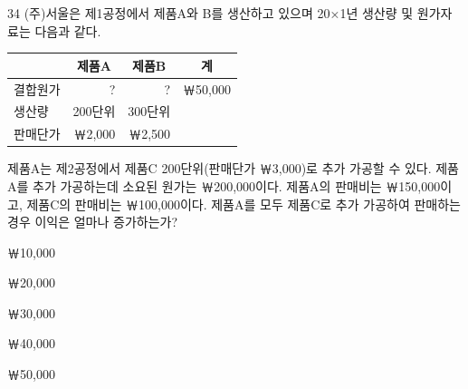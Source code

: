 \begin{question}{34}
(주)서울은 제1공정에서 제품A와 B를 생산하고 있으며 20×1년 생산량 및 원가자료는 다음과 같다.

{\small\centering
\begin{tabular}{|l|r|r|r|}
\hline
 & \multicolumn{1}{c|}{제품A} & \multicolumn{1}{c|}{제품B} & \multicolumn{1}{c|}{계} \\
\hline
결합원가 & ? & ? & ￦50,000 \\
생산량 & 200단위 & 300단위 & \\
판매단가 & ￦2,000 & ￦2,500 & \\
\hline
\end{tabular}\par}

제품A는 제2공정에서 제품C 200단위(판매단가 ￦3,000)로 추가 가공할 수 있다. 제품A를 추가 가공하는데 소요된 원가는 ￦200,000이다. 제품A의 판매비는 ￦150,000이고, 제품C의 판매비는 ￦100,000이다. 제품A를 모두 제품C로 추가 가공하여 판매하는 경우 이익은 얼마나 증가하는가? \par
\begin{choices}
  \item ￦10,000
  \item ￦20,000
  \item ￦30,000
  \item ￦40,000
  \item ￦50,000
\end{choices}
\end{question}
